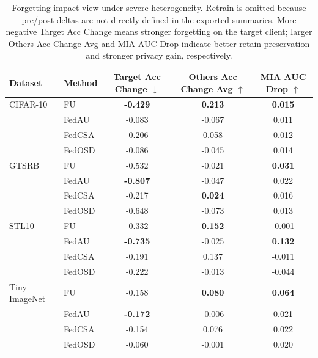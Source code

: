 \begin{table}[t]
\centering
\caption{Forgetting-impact view under severe heterogeneity. Retrain is omitted because pre/post deltas are not directly defined in the exported summaries. More negative Target Acc Change means stronger forgetting on the target client; larger Others Acc Change Avg and MIA AUC Drop indicate better retain preservation and stronger privacy gain, respectively.}
\label{tab:severe_cross_dataset_effect}
\begin{tabular}{llccc}
\toprule
Dataset & Method & Target Acc Change $\downarrow$ & Others Acc Change Avg $\uparrow$ & MIA AUC Drop $\uparrow$ \\
\midrule
CIFAR-10 & FU & \textbf{-0.429} & \textbf{0.213} & \textbf{0.015} \\
 & FedAU & -0.083 & -0.067 & 0.011 \\
 & FedCSA & -0.206 & 0.058 & 0.012 \\
 & FedOSD & -0.086 & -0.045 & 0.014 \\
\midrule
GTSRB & FU & -0.532 & -0.021 & \textbf{0.031} \\
 & FedAU & \textbf{-0.807} & -0.047 & 0.022 \\
 & FedCSA & -0.217 & \textbf{0.024} & 0.016 \\
 & FedOSD & -0.648 & -0.073 & 0.013 \\
\midrule
STL10 & FU & -0.332 & \textbf{0.152} & -0.001 \\
 & FedAU & \textbf{-0.735} & -0.025 & \textbf{0.132} \\
 & FedCSA & -0.191 & 0.137 & -0.011 \\
 & FedOSD & -0.222 & -0.013 & -0.044 \\
\midrule
Tiny-ImageNet & FU & -0.158 & \textbf{0.080} & \textbf{0.064} \\
 & FedAU & \textbf{-0.172} & -0.006 & 0.021 \\
 & FedCSA & -0.154 & 0.076 & 0.022 \\
 & FedOSD & -0.060 & -0.001 & 0.020 \\
\bottomrule
\end{tabular}
\end{table}
